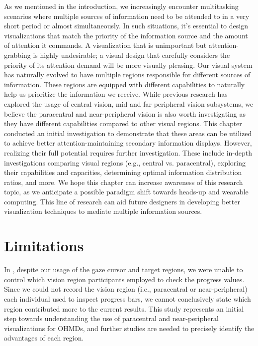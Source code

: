 As we mentioned in the introduction, we increasingly encounter multitasking scenarios where multiple sources of information need to be attended to in a very short period or almost simultaneously. In such situations, it's essential to design visualizations that match the priority of the information source and the amount of attention it commands. A visualization that is unimportant but attention-grabbing is highly undesirable; a visual design that carefully considers the priority of its attention demand will be more visually pleasing. Our visual system has naturally evolved to have multiple regions responsible for different sources of information. These regions are equipped with different capabilities to naturally help us prioritize the information we receive. While previous research has explored the usage of central vision, mid and far peripheral vision subsystems, we believe the paracentral and near-peripheral vision is also worth investigating as they have different capabilities compared to other visual regions. This chapter conducted an initial investigation to demonstrate that these areas can be utilized to achieve better attention-maintaining secondary information displays. However, realizing their full potential requires further investigation. These include in-depth investigations comparing visual regions (e.g., central vs. paracentral), exploring their capabilities and capacities, determining optimal information distribution ratios, and more. We hope this chapter can increase awareness of this research topic, as we anticipate a possible paradigm shift towards heads-up and wearable computing. This line of research can aid future designers in developing better visualization techniques to mediate multiple information sources.










\section{Limitations}
\label{sec:Progressbar:limitations}

In \studyone{}, despite our usage of the gaze cursor and target regions, we were unable to control which vision region participants employed to check the progress values. Since we could not record the vision region (i.e., paracentral or near-peripheral) each individual used to inspect progress bars, we cannot conclusively state which region contributed more to the current results. This study represents an initial step towards understanding the use of paracentral and near-peripheral visualizations for OHMDs, and further studies are needed to precisely identify the advantages of each region.

